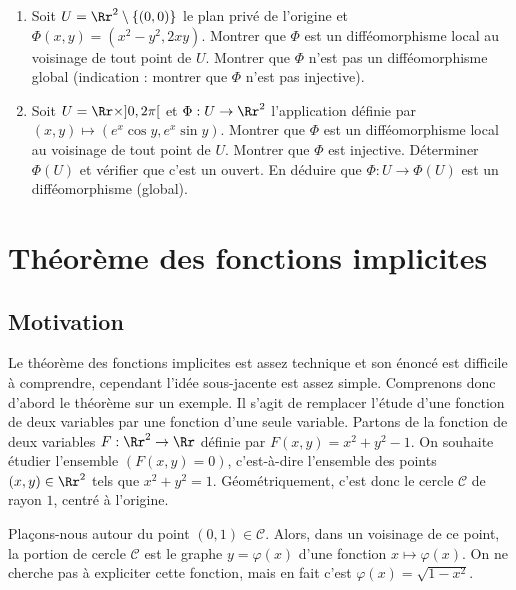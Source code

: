 \documentclass[11pt, class=report,crop=false]{standalone}
\begin{document}
\begin{miniexercices}
\sauteligne
\begin{enumerate}
  \item Soit $U = \Rr^2 \setminus \{ (0,0) \}$ le plan privé de l'origine et $\Phi(x,y)=(x^2-y^2,2xy)$.  
  Montrer que $\Phi$ est un difféomorphisme local au voisinage de
  tout point de $U$. Montrer que $\Phi$ n'est pas un difféomorphisme global (indication : montrer que $\Phi$ n'est pas injective).
  
  \item Soit $U = \Rr \times ]0,2\pi[$
  et $\Phi : U \to \Rr^2$ l'application définie
  par $(x,y) \mapsto (e^x\cos y,e^x\sin y)$.
  Montrer que $\Phi$ est un difféomorphisme local au voisinage de
  tout point de $U$.  Montrer que $\Phi$ est injective. Déterminer $\Phi(U)$ et vérifier que c'est un ouvert. En déduire que $\Phi : U \to \Phi(U)$ est un difféomorphisme (global).
\end{enumerate}
\end{miniexercices}




\section{Théorème des fonctions implicites}

\subsection{Motivation}

Le théorème des fonctions implicites est assez technique et son énoncé est difficile à comprendre, cependant l'idée  sous-jacente est assez simple.
Comprenons donc d'abord le théorème sur un exemple.
Il s'agit de remplacer l'étude d'une fonction de deux variables par une fonction d'une seule variable.
Partons de la fonction de deux variables $F : \Rr^2 \to \Rr$ définie par $F(x,y) = x^2+y^2-1$.
On souhaite étudier l'ensemble $(F(x,y)=0)$, c'est-à-dire l'ensemble des points $(x,y) \in \Rr^2$ tels que $x^2+y^2=1$.
Géométriquement, c'est donc le cercle $\mathcal{C}$ de rayon $1$, centré à l'origine.



\bigskip

Plaçons-nous autour du point $(0,1) \in \mathcal{C}$. Alors, dans un voisinage de ce point, la portion de cercle $\mathcal{C}$ est le graphe $y = \varphi(x)$ d'une fonction $x \mapsto \varphi(x)$. On ne cherche pas à expliciter cette fonction, mais en fait c'est $\varphi(x) = \sqrt{1-x^2}$.
\end{document}
